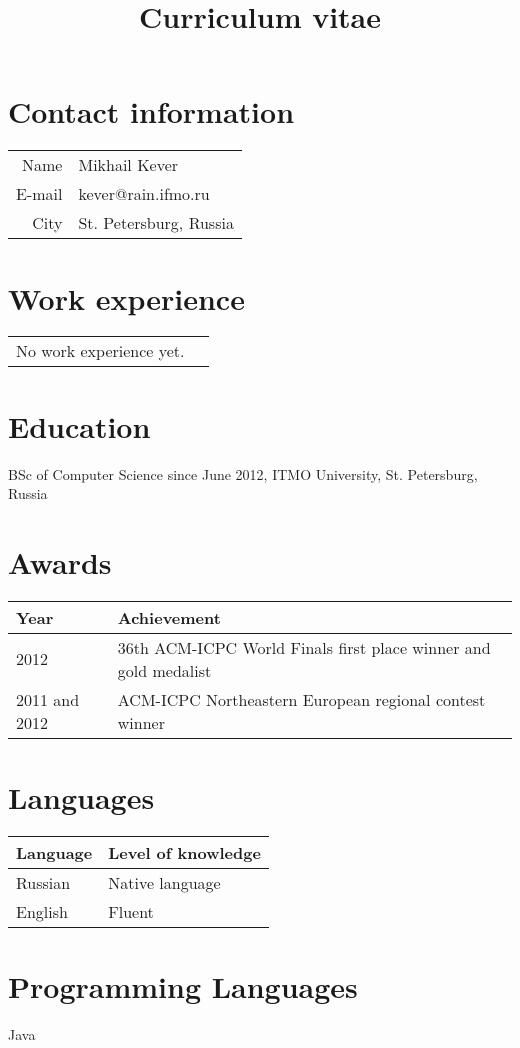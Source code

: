 \documentclass[11pt,a4paper,oneside]{article}
\begin{document}
\title{Curriculum vitae}
\date{}        
\maketitle

\section{Contact information}
\begin{center}
\begin{tabular}{r|l}
    Name&Mikhail Kever \\
    E-mail&kever@rain.ifmo.ru \\
    City& St. Petersburg, Russia
\end{tabular}
\end{center}

\section{Work experience}
\begin{center}
\begin{tabular}{rl}
    No work experience yet.    
\end{tabular}
\end{center}

\section{Education}
    BSc of Computer Science since June 2012, ITMO University, St. Petersburg, Russia

\section{Awards}
\begin{center}
    \begin{tabular}{l|l}
        Year&Achievement \\
        \hline
        2012&36th ACM-ICPC World Finals first place winner and gold medalist \\
        2011 and 2012&ACM-ICPC Northeastern European regional contest winner \\
    \end{tabular}
\end{center}

\section{Languages}
\begin{center}  
    \begin{tabular}{l|l}
        Language&Level of knowledge \\
        \hline
        Russian&Native language \\ 
        English&Fluent \\
    \end{tabular}
\end{center}

\section{Programming Languages}
    Java
\end{document}
